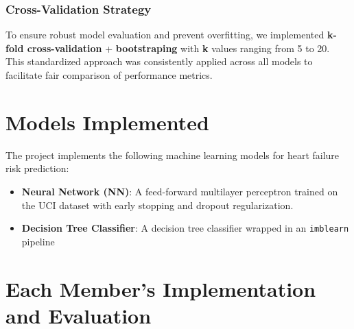 \documentclass[11pt,a4paper]{article}
\begin{document}
\subsubsection{Cross-Validation Strategy}
\vspace{-0.25cm}
To ensure robust model evaluation and prevent overfitting,
we implemented \textbf{k-fold cross-validation} + \textbf{bootstraping} with \textbf{k} values ranging from 5 to 20.
This standardized approach was consistently applied across all models to facilitate
fair comparison of performance metrics.

\section{Models Implemented}
The project implements the following machine learning models for heart
failure risk prediction:
\begin{itemize}
    \vspace{-0.25cm}
    \item \textbf{Neural Network (NN)}: A feed-forward multilayer perceptron trained on the UCI dataset with early stopping and dropout regularization.
    \item \textbf{Decision Tree Classifier}: A decision tree classifier wrapped in an \texttt{imblearn} pipeline
\end{itemize}



\section{Each Member's Implementation and Evaluation}
\end{document}
